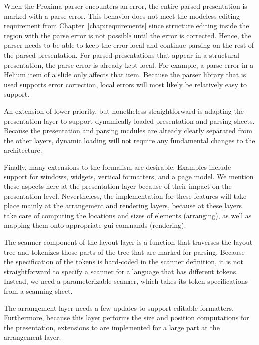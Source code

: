 When the Proxima parser encounters an error, the entire parsed presentation is marked with a parse error. This behavior does not meet the modeless editing requirement from Chapter~\ref{chap:requirements} since structure editing inside the region with the parse error is not possible until the error is corrected. Hence, the parser needs to be able to keep the error local and continue parsing on the rest of the parsed presentation. For parsed presentations that appear in a structural presentation, the parse error is already kept local. For example, a parse error in a Helium item of a slide only affects that item. Because the parser library that is used supports error correction, local errors will most likely be relatively easy to support. 


An extension of lower priority, but nonetheless straightforward is adapting the presentation layer to support dynamically loaded presentation and parsing sheets. Because the presentation and parsing modules are already clearly separated from the other layers, dynamic loading will not require any fundamental changes to the architecture.

Finally, many extensions to the  formalism are desirable. Examples include support for windows, widgets, vertical formatters, and a page model. We mention these aspects here at the presentation layer because of their impact on the presentation level. Nevertheless, the implementation for these features will take place mainly at the arrangement and rendering layers, because at these layers take care of computing the locations and sizes of {\Xprez} elements (arranging), as well as mapping them onto appropriate gui commands (rendering).


The scanner component of the layout layer is a function that traverses the layout tree and tokenizes those parts of the tree that are marked for parsing. Because the specification of the tokens is hard-coded in the scanner definition, it is not straightforward to specify a scanner for a language that has different tokens. Instead, we need a parameterizable scanner, which takes its token specifications from a scanning sheet.


The arrangement layer needs a few updates to support editable formatters. Furthermore, because this layer performs the size and position computations for the presentation, extensions to {\Xprez} are implemented for a large part at the arrangement layer.

